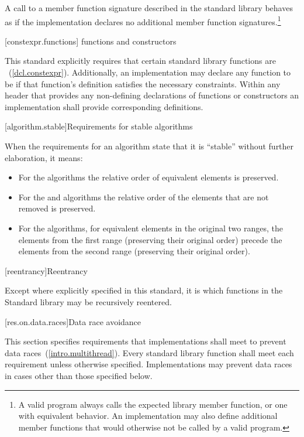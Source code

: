 \pnum
A call to a member function signature described in the \Cpp standard library
behaves as if the implementation declares no additional member
function signatures.\footnote{A valid \Cpp program always calls the expected library
member function, or one with equivalent behavior.
An implementation may also
define additional member functions that would otherwise not be called by a
valid \Cpp program.}

[constexpr.functions]{ functions and constructors}

\pnum
This standard explicitly requires that certain standard library functions are
~(\ref{dcl.constexpr}). Additionally, an implementation may declare any
function to be  if that function's definition satisfies the necessary
constraints.
Within any header that provides any non-defining declarations of 
functions or constructors an implementation shall provide corresponding definitions.

[algorithm.stable]{Requirements for stable algorithms}

\pnum
{}%
%
When the requirements for an algorithm state that it is ``stable'' without further elaboration,
it means:

\begin{itemize}
\item For the  algorithms the relative order of equivalent
elements is preserved.

\item For the  and  algorithms the relative order of
the elements that are not removed is preserved.

\item For the  algorithms, for equivalent elements in
the original two ranges, the elements from the first range (preserving their
original order) precede the elements from the second range (preserving their
original order).
\end{itemize}

[reentrancy]{Reentrancy}

\pnum
Except where explicitly specified in this standard, it is  which functions in the Standard \Cpp
library may be recursively reentered.

[res.on.data.races]{Data race avoidance}

\pnum
This section specifies requirements that implementations shall meet to prevent data
races~(\ref{intro.multithread}).
Every standard library function shall meet each requirement unless otherwise specified.
Implementations may prevent data races in cases other than those specified below.

